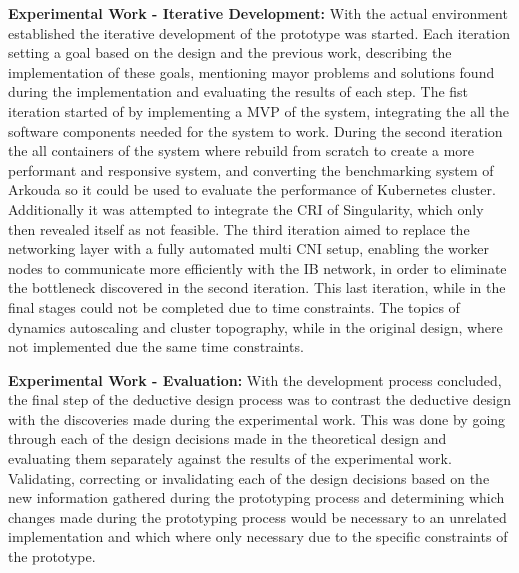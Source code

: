 \textbf{Experimental Work - Iterative Development:} With the actual environment established the iterative development of the prototype
was started. Each iteration setting a goal based on the design and the previous work, describing the implementation of these goals,
mentioning mayor problems and solutions found during the implementation and evaluating the results of each step.
The fist iteration started of by implementing a \ac{MVP} of the system, integrating the all the software components needed for the system to work.
During the second iteration the all containers of the system where rebuild from scratch to create a more performant and responsive
system, and converting the benchmarking system of Arkouda so it could be used to evaluate the performance of Kubernetes
cluster. Additionally it was attempted to integrate the \ac{CRI} of Singularity, which only then revealed itself as not feasible.
The third iteration aimed to replace the networking layer with a fully automated multi \ac{CNI} setup,
enabling the worker nodes to communicate more efficiently with the \ac{IB} network,
in order to eliminate the bottleneck discovered in the second iteration.
This last iteration, while in the final stages could not be completed due to time constraints.
The topics of dynamics autoscaling and cluster topography, while in the original design, where not implemented due the
same time constraints.

\textbf{Experimental Work - Evaluation:} With the development process concluded,
the final step of the deductive design process was to contrast the deductive design with the discoveries made during the
experimental work. This was done by going through each of the design decisions made in the theoretical design and
evaluating them separately against the results of the experimental work.
Validating, correcting or invalidating each of the design decisions based on the new information gathered during
the prototyping process and determining which changes made during the prototyping process would be necessary to
an unrelated implementation and which where only necessary due to the specific constraints of the prototype.


